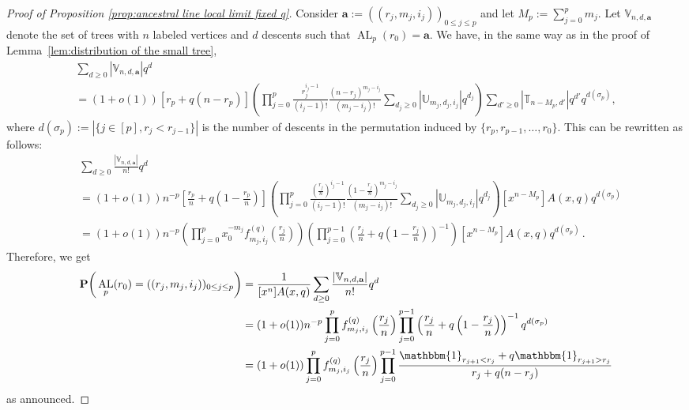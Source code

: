 \documentclass{article}
\theoremstyle{remark}
\newcommand{\bT}{\mathbb{T}}
\newcommand{\abs}[1]{{\left|#1\right|}}
\newcommand{\ba}{\textbf{a}}
\newcommand{\prob}[1]{\mathbf{P}{\left(#1\right)}}
\newcommand{\bV}{\mathbb{V}}
\newcommand{\bU}{\mathbb{U}}
\newcommand{\One}[1]{\mathbbm{1}_{#1}}
\DeclareMathOperator{\AncestralLine}{AL}
\begin{document}
\begin{proof}[Proof of Proposition \ref{prop:ancestral line local limit fixed q}]
Consider $\ba := ((r_j,m_j,i_j))_{0 \leq j \leq p}$ and let $M_p := \sum_{j=0}^p m_j$.
Let $\bV_{n,d,\ba}$ denote the set of trees with $n$ labeled vertices and $d$ descents such that $\AncestralLine_p(r_0)=\ba$. We have, in the same way as in the proof of Lemma~\ref{lem:distribution of the small tree},
\begin{multline*}
\sum_{d \geq 0} \abs{\bV_{n,d,\ba}} q^d 
\\= (1+o(1)) \left[ r_p+q(n-r_p) \right] 
\left( \prod_{j=0}^p \frac{r_j^{i_j-1}}{(i_j-1)!} \frac{(n-r_j)^{m_j-i_j}}{(m_j-i_j)!} \sum_{d_j \geq 0} \abs{\bU_{m_j,d_j,i_j}}q^{d_j} \right)
\sum_{d' \geq 0} |\bT_{n-M_p,d'}| q^{d'}  q^{d(\sigma_p)},
\end{multline*}
where $d(\sigma_p):= \abs{\{ j \in [p], r_j<r_{j-1}\}}$ is the number of descents in the permutation induced by $\{r_p,r_{p-1},\ldots,r_0\}$.
This can be rewritten as follows:
\begin{align*}
&\sum_{d \geq 0} \frac{\abs{\bV_{n,d,\ba}}}{n!} q^d 
\\&= (1+o(1)) n^{-p} \left[ \frac{r_p}{n} + q \left( 1-\frac{r_p}{n} \right) \right] 
\left( \prod_{j=0}^p \frac{\left(\frac{r_j}{n}\right)^{i_j-1}}{(i_j-1)!} \frac{\left(1-\frac{r_j}{n}\right)^{m_j-i_j}}{(m_j-i_j)!} \sum_{d_j \geq 0} \abs{\bU_{m_j,d_j,i_j}}q^{d_j} \right)
[x^{n-M_p}]A(x,q) q^{d(\sigma_p)}
\\&= (1+o(1)) n^{-p} 
\left( \prod_{j=0}^p x_0^{-m_j} f_{m_j,i_j}^{(q)}\left( \frac{r_j}{n} \right) \right)
\left( \prod_{j=0}^{p-1} \left( \frac{r_j}{n} + q\left( 1-\frac{r_j}{n}\right) \right)^{-1} \right)
[x^{n-M_p}]A(x,q) q^{d(\sigma_p)} \,.
\end{align*}
Therefore, we get
\begin{align*}
\prob{\big. \AncestralLine_p(r_0) = ((r_j,m_j,i_j))_{0 \leq j \leq p}} &= \frac{1}{[x^n]A(x,q)} \sum_{d \geq 0} \frac{\abs{\bV_{n,d,\ba}}}{n!} q^d\\
&= (1+o(1)) n^{-p} \prod_{j=0}^p f_{m_j,i_j}^{(q)}\left( \frac{r_j}{n} \right) \prod_{j=0}^{p-1} \left( \frac{r_j}{n} + q\left( 1-\frac{r_j}{n}\right) \right)^{-1} q^{d(\sigma_p)}\\
&= (1+o(1)) \prod_{j=0}^p f_{m_j,i_j}^{(q)}\left( \frac{r_j}{n} \right) \prod_{j=0}^{p-1} \frac{\One{r_{j+1} < r_j} + q \One{r_{j+1} > r_j}}{r_j + q(n-r_j)}
\end{align*}
as announced.
\end{proof}
\end{document}
